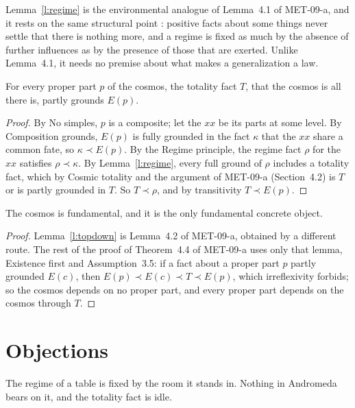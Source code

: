 \documentclass{situationist-preprint}
\begin{document}
Lemma~\ref{l:regime} is the environmental analogue of Lemma~4.1 of MET-09-a, and it rests on the same structural point \citep{Armstrong1997}: positive facts about some things never settle that there is nothing more, and a regime is fixed as much by the absence of further influences as by the presence of those that are exerted. Unlike Lemma~4.1, it needs no premise about what makes a generalization a law.

\begin{lemma}\label{l:topdown}
For every proper part $p$ of the cosmos, the totality fact $T$, that the cosmos is all there is, partly grounds $E(p)$.
\end{lemma}

\begin{proof}
By No simples, $p$ is a composite; let the $xx$ be its parts at some level. By Composition grounds, $E(p)$ is fully grounded in the fact $\kappa$ that the $xx$ share a common fate, so $\kappa \prec E(p)$. By the Regime principle, the regime fact $\rho$ for the $xx$ satisfies $\rho \prec \kappa$. By Lemma~\ref{l:regime}, every full ground of $\rho$ includes a totality fact, which by Cosmic totality and the argument of MET-09-a (Section~4.2) is $T$ or is partly grounded in $T$. So $T \prec \rho$, and by transitivity $T \prec E(p)$.
\end{proof}

\begin{theorem}\label{t:main}
The cosmos is fundamental, and it is the only fundamental concrete object.
\end{theorem}

\begin{proof}
Lemma~\ref{l:topdown} is Lemma~4.2 of MET-09-a, obtained by a different route. The rest of the proof of Theorem~4.4 of MET-09-a uses only that lemma, Existence first and Assumption~3.5: if a fact about a proper part $p$ partly grounded $E(c)$, then $E(p) \prec E(c) \prec T \prec E(p)$, which irreflexivity forbids; so the cosmos depends on no proper part, and every proper part depends on the cosmos through $T$.
\end{proof}

\section{Objections}

\begin{objection}
The regime of a table is fixed by the room it stands in. Nothing in Andromeda bears on it, and the totality fact is idle.
\end{objection}
\end{document}
